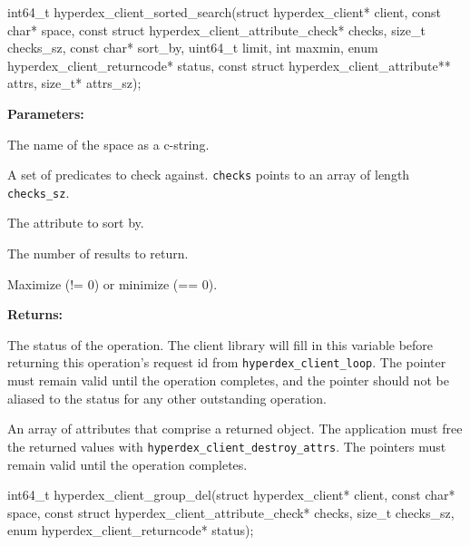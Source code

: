 \funcsep
\begin{ccode}
int64_t hyperdex_client_sorted_search(struct hyperdex_client* client,
                const char* space,
                const struct hyperdex_client_attribute_check* checks, size_t checks_sz,
                const char* sort_by,
                uint64_t limit,
                int maxmin,
                enum hyperdex_client_returncode* status,
                const struct hyperdex_client_attribute** attrs, size_t* attrs_sz);
\end{ccode}
\funcdesc 

\noindent\textbf{Parameters:}
\begin{description}[labelindent=\widthof{{\texttt{checks}, \texttt{checks\_sz}}},leftmargin=*,noitemsep,nolistsep,align=right]
\item[\texttt{space}] The name of the space as a c-string.
\item[\texttt{checks}, \texttt{checks\_sz}] A set of predicates to check against.  \texttt{checks} points to an array of length \texttt{checks\_sz}.
\item[\texttt{sort\_by}] The attribute to sort by.
\item[\texttt{limit}] The number of results to return.
\item[\texttt{maxmin}] Maximize (!= 0) or minimize (== 0).
\end{description}

\noindent\textbf{Returns:}
\begin{description}[labelindent=\widthof{{\texttt{attrs}, \texttt{attrs\_sz}}},leftmargin=*,noitemsep,nolistsep,align=right]
\item[\texttt{status}] The status of the operation.  The client library will fill in this variable before returning this operation's request id from \texttt{hyperdex\_client\_loop}.  The pointer must remain valid until the operation completes, and the pointer should not be aliased to the status for any other outstanding operation.
\item[\texttt{attrs}, \texttt{attrs\_sz}] An array of attributes that comprise a returned object.  The application must free the returned values with \texttt{hyperdex\_client\_destroy\_attrs}.  The pointers must remain valid until the operation completes.
\end{description}

\funcsep
\begin{ccode}
int64_t hyperdex_client_group_del(struct hyperdex_client* client,
                const char* space,
                const struct hyperdex_client_attribute_check* checks, size_t checks_sz,
                enum hyperdex_client_returncode* status);
\end{ccode}
\funcdesc 

